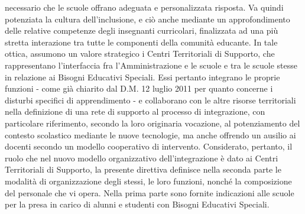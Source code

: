 necessario che le scuole offrano adeguata e personalizzata risposta.
Va quindi potenziata la cultura dell'inclusione, e ciò anche mediante un approfondimento delle relative
competenze degli insegnanti curricolari, finalizzata ad una più stretta interazione tra tutte le componenti della
comunità educante.
In tale ottica, assumono un valore strategico i Centri Territoriali di Supporto, che rappresentano l'interfaccia
fra l'Amministrazione e le scuole e tra le scuole stesse in relazione ai Bisogni Educativi Speciali. Essi
pertanto integrano le proprie funzioni - come già chiarito dal D.M. 12 luglio 2011 per quanto concerne i
disturbi specifici di apprendimento - e collaborano con le altre risorse territoriali nella definizione di una rete
di supporto al processo di integrazione, con particolare riferimento, secondo la loro originaria vocazione, al
potenziamento del contesto scolastico mediante le nuove tecnologie, ma anche offrendo un ausilio ai docenti
secondo un modello cooperativo di intervento.
Considerato, pertanto, il ruolo che nel nuovo modello organizzativo dell'integrazione è dato ai Centri
Territoriali di Supporto, la presente direttiva definisce nella seconda parte le modalità di organizzazione degli
stessi, le loro funzioni, nonché la composizione del personale che vi opera.
Nella prima parte sono fornite indicazioni alle scuole per la presa in carico di alunni e studenti con Bisogni
Educativi Speciali.
